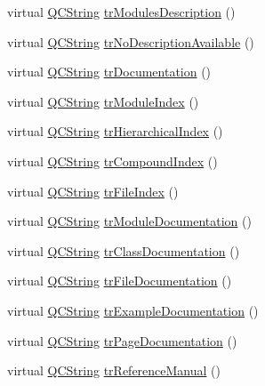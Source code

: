 \begin{DoxyCompactItemize}
virtual \mbox{\hyperlink{class_q_c_string}{Q\+C\+String}} \mbox{\hyperlink{class_translator_arabic_aba7cd02c2d5f051596e1f64b9d6d7037}{tr\+Modules\+Description}} ()
\item 
virtual \mbox{\hyperlink{class_q_c_string}{Q\+C\+String}} \mbox{\hyperlink{class_translator_arabic_a533c780424da89c73dbd2b44da8e61e0}{tr\+No\+Description\+Available}} ()
\item 
virtual \mbox{\hyperlink{class_q_c_string}{Q\+C\+String}} \mbox{\hyperlink{class_translator_arabic_a1b58fe62b474d91b2128db010ebc973d}{tr\+Documentation}} ()
\item 
virtual \mbox{\hyperlink{class_q_c_string}{Q\+C\+String}} \mbox{\hyperlink{class_translator_arabic_a763aedc374d5a545644b448871ddd6c1}{tr\+Module\+Index}} ()
\item 
virtual \mbox{\hyperlink{class_q_c_string}{Q\+C\+String}} \mbox{\hyperlink{class_translator_arabic_a7da261a6bc8035969e40c01fe4ea85d7}{tr\+Hierarchical\+Index}} ()
\item 
virtual \mbox{\hyperlink{class_q_c_string}{Q\+C\+String}} \mbox{\hyperlink{class_translator_arabic_ab554e3f789d9189e6fc94f00a1746983}{tr\+Compound\+Index}} ()
\item 
virtual \mbox{\hyperlink{class_q_c_string}{Q\+C\+String}} \mbox{\hyperlink{class_translator_arabic_a9679911e97d493f2c83d0de23f623922}{tr\+File\+Index}} ()
\item 
virtual \mbox{\hyperlink{class_q_c_string}{Q\+C\+String}} \mbox{\hyperlink{class_translator_arabic_a2d1938484e265a2ca1c0d73fd9f750cf}{tr\+Module\+Documentation}} ()
\item 
virtual \mbox{\hyperlink{class_q_c_string}{Q\+C\+String}} \mbox{\hyperlink{class_translator_arabic_a169f9b2baaf46468d775d1934f4a8043}{tr\+Class\+Documentation}} ()
\item 
virtual \mbox{\hyperlink{class_q_c_string}{Q\+C\+String}} \mbox{\hyperlink{class_translator_arabic_a8570fc7161fa78fa6304be53346908cb}{tr\+File\+Documentation}} ()
\item 
virtual \mbox{\hyperlink{class_q_c_string}{Q\+C\+String}} \mbox{\hyperlink{class_translator_arabic_afcb9a17ca0cf3e9a30bc8fcaa3eb0529}{tr\+Example\+Documentation}} ()
\item 
virtual \mbox{\hyperlink{class_q_c_string}{Q\+C\+String}} \mbox{\hyperlink{class_translator_arabic_a074729639b28138464929fa6232672bf}{tr\+Page\+Documentation}} ()
\item 
virtual \mbox{\hyperlink{class_q_c_string}{Q\+C\+String}} \mbox{\hyperlink{class_translator_arabic_a7ced5f4c01b62f92c8bca76004b75a11}{tr\+Reference\+Manual}} ()

\end{DoxyCompactItemize}
